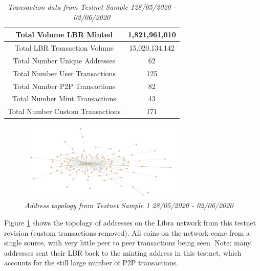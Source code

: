 \documentclass[12pt,openany,a4paper]{book}
\begin{document}
\begin{table}[h!]
    \caption{\sl Transaction data from Testnet Sample 128/05/2020 - 02/06/2020}
    \label{tx_table_1}
\begin{center}
\begin{tabular}{ |c|c| } 
    \hline
    Total Volume LBR Minted & 1,821,961,010 \\
    \hline
    Total LBR Transaction Volume & 15,020,134,142 \\
    \hline
    Total Number Unique Addresses & 62 \\
    \hline
    Total Number User Transactions & 125 \\
    \hline
    Total Number P2P Transactions & 82 \\
    \hline
    Total Number Mint Transactions & 43 \\
    \hline
    Total Number Custom Transactions & 171 \\
    \hline
\end{tabular}
\end{center}
\end{table}

\begin{figure}[h!]
    \caption{\sl Address topology from Testnet Sample 1 28/05/2020 - 02/06/2020}
    \label{tx_topology_1}
    \begin{center}
    \includegraphics[width=0.7\textwidth]{imgs/tx_topology_2.png}
    \end{center}
\end{figure}

Figure \ref{tx_topology_1} shows the topology of addresses on the Libra network 
from this testnet revision (custom transactions removed). All coins on the network 
come from a single source, with very little peer to peer transactions being seen. 
Note: many addresses sent their LBR back to the minting address in this testnet, which
accounts for the still large number of P2P transactions.
\end{document}
